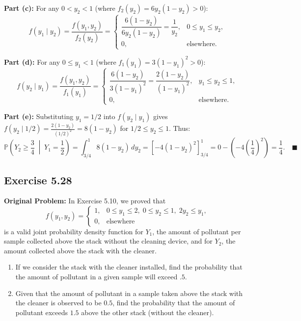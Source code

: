 \documentclass[11pt, letterpaper]{article}
\theoremstyle{definition}
\theoremstyle{remark}
\newcommand{\Prob}{\mathbb{P}}
\begin{document}
\textbf{Part (c):} For any $0 < y_2 < 1$ (where $f_2(y_2) = 6y_2(1 - y_2) > 0$):
\[ f(y_1 \mid y_2) = \frac{f(y_1, y_2)}{f_2(y_2)} = \begin{cases} \dfrac{6(1 - y_2)}{6y_2(1 - y_2)} = \dfrac{1}{y_2}, & 0 \le y_1 \le y_2, \\ 0, & \text{elsewhere.} \end{cases} \]

\textbf{Part (d):} For any $0 \le y_1 < 1$ (where $f_1(y_1) = 3(1 - y_1)^2 > 0$):
\[ f(y_2 \mid y_1) = \frac{f(y_1, y_2)}{f_1(y_1)} = \begin{cases} \dfrac{6(1 - y_2)}{3(1 - y_1)^2} = \dfrac{2(1 - y_2)}{(1 - y_1)^2}, & y_1 \le y_2 \le 1, \\ 0, & \text{elsewhere.} \end{cases} \]

\textbf{Part (e):} Substituting $y_1 = 1/2$ into $f(y_2 \mid y_1)$ gives $f(y_2 \mid 1/2) = \frac{2(1 - y_2)}{(1/2)^2} = 8(1 - y_2)$ for $1/2 \le y_2 \le 1$. Thus:
\[ \Prob\left(Y_2 \ge \frac{3}{4} \;\middle|\; Y_1 = \frac{1}{2}\right) = \int_{3/4}^1 8(1 - y_2) \, dy_2 = \left[ -4(1 - y_2)^2 \right]_{3/4}^1 = 0 - \left(-4\left(\frac{1}{4}\right)^2\right) = \frac{1}{4}. \quad \blacksquare \]

\subsection{Exercise 5.28}

\textbf{Original Problem:}
In Exercise 5.10, we proved that
\[ f(y_1, y_2) = \begin{cases} 1, & 0 \le y_1 \le 2, \; 0 \le y_2 \le 1, \; 2y_2 \le y_1, \\ 0, & \text{elsewhere} \end{cases} \]
is a valid joint probability density function for $Y_1$, the amount of pollutant per sample collected above the stack without the cleaning device, and for $Y_2$, the amount collected above the stack with the cleaner.
\begin{enumerate}[label=\textbf{\alph*}]
    \item If we consider the stack with the cleaner installed, find the probability that the amount of pollutant in a given sample will exceed $.5$.
    \item Given that the amount of pollutant in a sample taken above the stack with the cleaner is observed to be $0.5$, find the probability that the amount of pollutant exceeds $1.5$ above the other stack (without the cleaner).
\end{enumerate}
\end{document}
